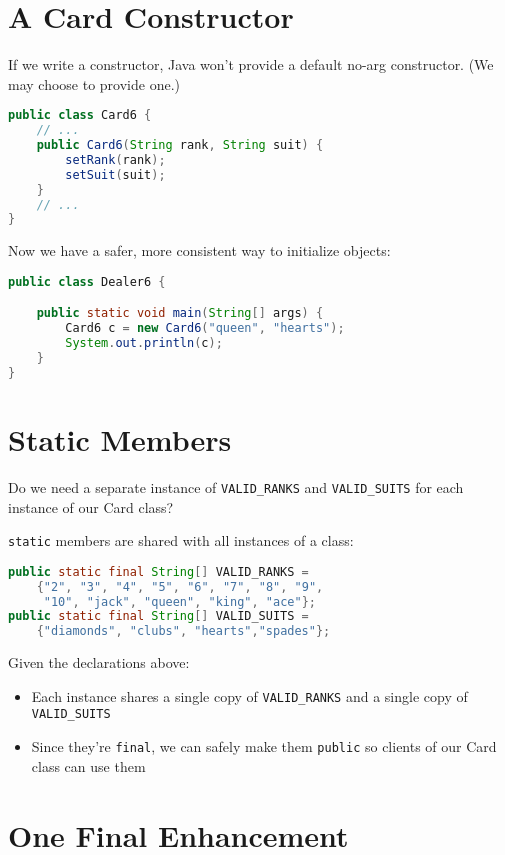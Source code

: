 \documentclass{article}
\begin{document}
\section{A Card Constructor}


If we write a constructor, Java won't provide a default no-arg constructor. (We may choose to provide one.)
\begin{lstlisting}[language=Java]
public class Card6 {
    // ...
    public Card6(String rank, String suit) {
        setRank(rank);
        setSuit(suit);
    }
    // ...
}
\end{lstlisting}

Now we have a safer, more consistent  way to initialize objects:
\begin{lstlisting}[language=Java]
public class Dealer6 {

    public static void main(String[] args) {
        Card6 c = new Card6("queen", "hearts");
        System.out.println(c);
    }
}
\end{lstlisting}





\section{Static Members}


Do we need a separate instance of {\tt VALID\_RANKS} and {\tt VALID\_SUITS} for each instance of our Card class?

{\tt static} members are shared with all instances of a class:
\begin{lstlisting}[language=Java]
public static final String[] VALID_RANKS =
    {"2", "3", "4", "5", "6", "7", "8", "9",
     "10", "jack", "queen", "king", "ace"};
public static final String[] VALID_SUITS =
    {"diamonds", "clubs", "hearts","spades"};
\end{lstlisting}
Given the declarations above:
\begin{itemize}
\item Each instance shares a single copy of {\tt VALID\_RANKS} and a single copy of {\tt VALID\_SUITS}
\item Since they're {\tt final}, we can safely make them {\tt public} so clients of our Card class can use them
\end{itemize}





\section{One Final Enhancement}
\end{document}
